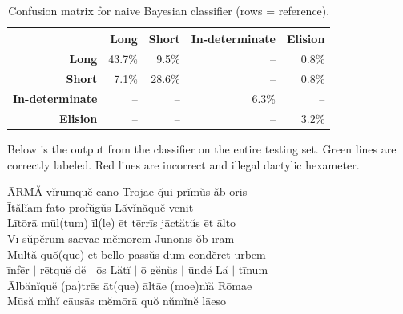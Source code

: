 \documentclass[12pt]{article}
\begin{document}
\begin{table}[h]
\begin{center}
\begin{tabular}{| r | r | r | r | r |}
\hline
& \textbf{Long} & \textbf{Short} & \textbf{In-determinate} & \textbf{Elision} \\ \hline
\textbf{Long} & 43.7\% & 9.5\% & -- & 0.8\% \\ \hline
\textbf{Short} & 7.1\% & 28.6\% & -- & 0.8\% \\ \hline
\textbf{In-determinate} & -- & -- & 6.3\% & -- \\ \hline
\textbf{Elision} & -- & -- & -- & 3.2\% \\ \hline
\end{tabular}
\caption{Confusion matrix for naive Bayesian classifier (rows = reference).}
\label{ref:naive_confusion}
\end{center}
\end{table}
Below is the output from the classifier on the entire testing set. Green lines are correctly labeled. Red lines are incorrect and illegal dactylic hexameter.
\begin{center}
\colorbox{highlightred}{\={A}RM\u{A} v\u{i}r\={u}mqu\u{e} c\={a}n\={o} Tr\={o}j\={ae} \u{qui} pr\u{i}m\u{u}s \u{a}b \={o}ris}\\ 
\colorbox{highlightred}{\={I}t\u{a}l\u{i}\={a}m f\={a}t\={o} pr\={o}f\u{u}g\u{u}s L\u{a}v\u{i}n\u{a}qu\u{e} v\={e}nit}\\ 
\colorbox{highlightred}{L\={i}t\={o}r\={a} m\={u}l(tum) \={i}l(le) \={e}t t\={e}rr\={i}s j\={a}ct\u{a}t\u{u}s \={e}t \={a}lto}\\ 
\colorbox{highlightred}{V\={i} s\u{u}p\u{e}r\={u}m s\={ae}v\={ae} m\u{e}m\={o}r\={e}m J\={u}n\={o}n\={i}s \u{o}b \={i}ram}\\ 
\colorbox{highlightred}{M\={u}lt\u{a} qu\u{o}(que) \={e}t b\={e}ll\={o} p\={a}ss\u{u}s d\={u}m c\={o}nd\u{e}r\={e}t \={u}rbem}\\ 
\colorbox{highlightgreen}{\={i}nf\={e}r $\vert$ r\={e}tqu\u{e} d\u{e} $\vert$ \={o}s L\u{a}t\u{i} $\vert$ \={o} g\u{e}n\u{u}s $\vert$ \={u}nd\u{e} L\u{a} $\vert$ t\={i}num}\\ 
\colorbox{highlightred}{\={A}lb\u{a}n\u{i}qu\u{e} (pa)tr\={e}s \={a}t(que) \={a}lt\={ae} (moe)n\u{i}\u{a} R\={o}mae}\\ 
\colorbox{highlightred}{M\={u}s\u{a} m\u{i}h\u{i} c\={au}s\={a}s m\u{e}m\={o}r\={a} qu\u{o} n\u{u}m\u{i}n\u{e} l\={ae}so}\\
\end{center}
\end{document}
